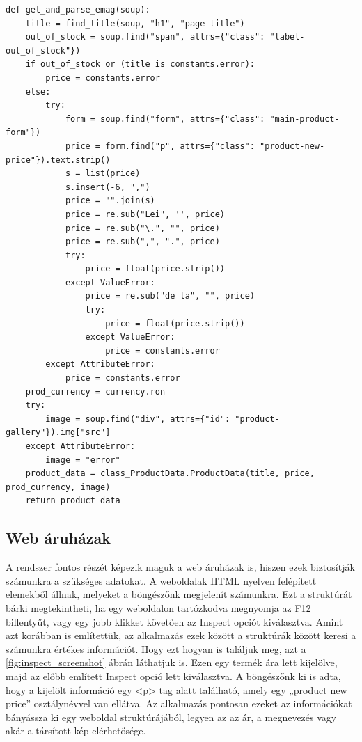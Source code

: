 \begin{lstlisting}[caption={Emag linket feldolgozó függvény}, label={lst:python_emag}, basicstyle=\footnotesize]
    def get_and_parse_emag(soup):
    title = find_title(soup, "h1", "page-title")
    out_of_stock = soup.find("span", attrs={"class": "label-out_of_stock"})
    if out_of_stock or (title is constants.error):
        price = constants.error
    else:
        try:
            form = soup.find("form", attrs={"class": "main-product-form"})
            price = form.find("p", attrs={"class": "product-new-price"}).text.strip()
            s = list(price)
            s.insert(-6, ",")
            price = "".join(s)
            price = re.sub("Lei", '', price)
            price = re.sub("\.", "", price)
            price = re.sub(",", ".", price)
            try:
                price = float(price.strip())
            except ValueError:
                price = re.sub("de la", "", price)
                try:
                    price = float(price.strip())
                except ValueError:
                    price = constants.error
        except AttributeError:
            price = constants.error
    prod_currency = currency.ron
    try:
        image = soup.find("div", attrs={"id": "product-gallery"}).img["src"]
    except AttributeError:
        image = "error"
    product_data = class_ProductData.ProductData(title, price, prod_currency, image)
    return product_data
\end{lstlisting}



\subsection{Web áruházak}

A rendszer fontos részét képezik maguk a web áruházak is, hiszen ezek biztosítják számunkra a szükséges adatokat. A weboldalak HTML nyelven felépített elemekből állnak, melyeket a böngészőnk megjelenít számunkra. Ezt a struktúrát bárki megtekintheti, ha egy weboldalon tartózkodva megnyomja az F12 billentyűt, vagy egy jobb klikket követően az Inspect opciót kiválasztva. Amint azt korábban is említettük, az alkalmazás ezek között a struktúrák között keresi a számunkra értékes információt. Hogy ezt hogyan is találjuk meg, azt a \ref{fig:inspect_screenshot} ábrán láthatjuk is. Ezen egy termék ára lett kijelölve, majd az előbb említett Inspect opció lett kiválasztva. A böngészőnk ki is adta, hogy a kijelölt információ egy <p> tag alatt található, amely egy „product new price” osztálynévvel van ellátva. Az alkalmazás pontosan ezeket az információkat bányássza ki egy weboldal struktúrájából, legyen az az ár, a megnevezés vagy akár a társított kép elérhetősége.

